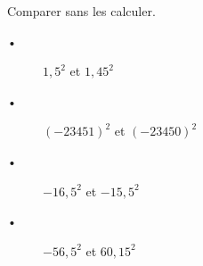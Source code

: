 
Comparer sans les calculer.
\begin{description}
\item[•] $1,5^2$ et $1,45^2$
\item[•] $(-23451)^2$ et $(-23450)^2$
\item[•] $-16,5^2$ et $-15,5^2$
\item[•] $-56,5^2$ et $60,15^2$
\end{description}